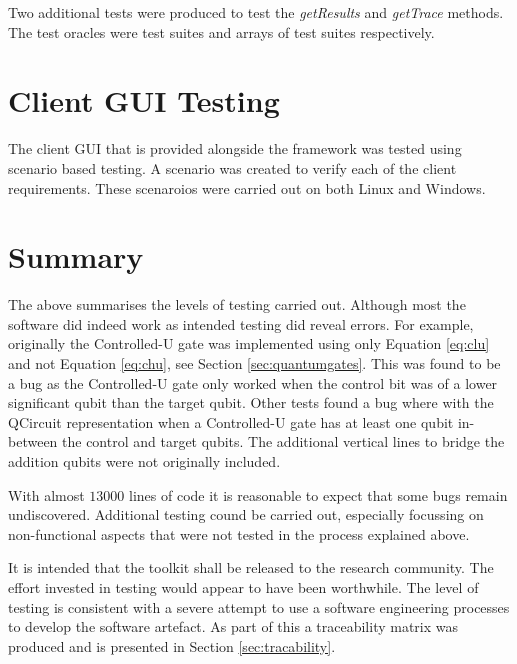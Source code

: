 Two additional tests were produced to test the \emph{getResults} and \emph{getTrace} methods.
The test oracles were test suites and arrays of test suites respectively.

\section{Client GUI Testing}
\label{sec:clientguitests}
The client GUI that is provided alongside the framework was tested using scenario based testing.
A scenario was created to verify each of the client requirements.
These scenaroios were carried out on both Linux and Windows.

\section{Summary}

The above summarises the levels of testing carried out.
Although most the software did indeed work as intended testing did reveal errors.
For example, originally the Controlled-U gate was implemented using only Equation \ref{eq:clu} and not Equation \ref{eq:chu}, see Section \ref{sec:quantumgates}.
This was found to be a bug as the Controlled-U gate only worked when the control bit was of a lower significant qubit than the target qubit.
Other tests found a bug where with the QCircuit representation when a Controlled-U gate has at least one qubit in-between the control and target qubits.
The additional vertical lines to bridge the addition qubits were not originally included.

With almost $13000$ lines of code it is reasonable to expect that some bugs remain undiscovered.
Additional testing cound be carried out, especially focussing on non-functional aspects that were not tested in the process explained above.

It is intended that the toolkit shall be released to the research community.
The effort invested in testing would appear to have been worthwhile.
The level of testing is consistent with a severe attempt to use a software engineering processes to develop the software artefact.
As part of this a traceability matrix was produced and is presented in Section \ref{sec:tracability}.

